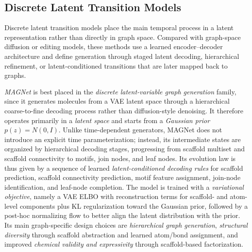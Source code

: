 \documentclass{article}
\begin{document}
\subsection{Discrete Latent Transition Models}
\label{sec:dt_latent}

Discrete latent transition models place the main temporal process in a latent representation rather than directly in graph space. Compared with graph-space diffusion or editing models, these methods use a learned encoder--decoder architecture and define generation through staged latent decoding, hierarchical refinement, or latent-conditioned transitions that are later mapped back to graphs.


\emph{MAGNet} \cite{hetzel2025magnet} is best placed in the \emph{discrete latent-variable graph generation} family, since it generates molecules from a VAE latent space through a hierarchical coarse-to-fine decoding process rather than diffusion-style denoising. It therefore operates primarily in a \emph{latent space} and starts from a \emph{Gaussian prior} $p(z)=N(0,I)$. Unlike time-dependent generators, MAGNet does not introduce an explicit time parameterization; instead, its intermediate states are organized by hierarchical decoding stages, progressing from scaffold multiset and scaffold connectivity to motifs, join nodes, and leaf nodes. Its evolution law is thus given by a sequence of learned \emph{latent-conditioned decoding rules} for scaffold prediction, scaffold connectivity prediction, motif feature assignment, join-node identification, and leaf-node completion. The model is trained with a \emph{variational objective}, namely a VAE ELBO with reconstruction terms for scaffold- and atom-level components plus KL regularization toward the Gaussian prior, followed by a post-hoc normalizing flow to better align the latent distribution with the prior. Its main graph-specific design choices are \emph{hierarchical graph generation}, \emph{structural diversity} through scaffold abstraction and learned atom/bond assignment, and improved \emph{chemical validity and expressivity} through scaffold-based factorization.
\end{document}
